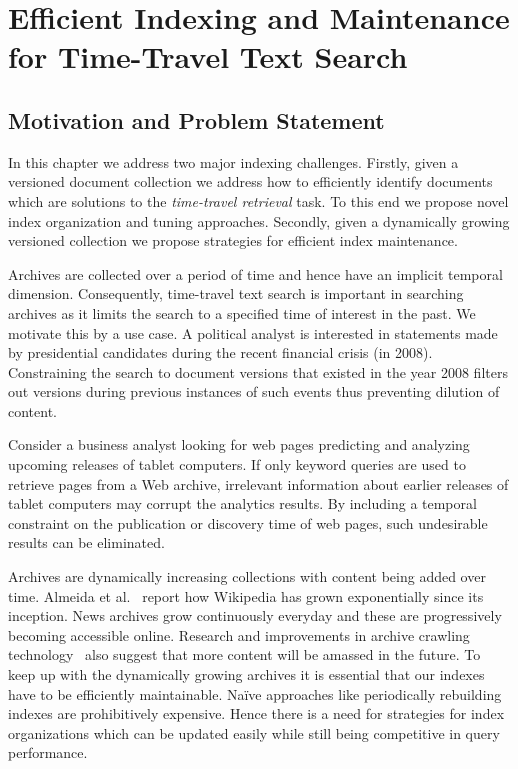 \chapter{Efficient Indexing and Maintenance for Time-Travel Text Search}
\label{chap:sharding}

\section{Motivation and Problem Statement}
In this chapter we address two major indexing challenges. Firstly, 
given a versioned document collection we address how to efficiently 
identify documents which are solutions to the \emph{time-travel 
retrieval} task. To this end we propose novel index organization and tuning approaches. Secondly, given a dynamically growing versioned 
collection we propose strategies for efficient index maintenance.

Archives are collected over a period of time and 
hence have an implicit temporal dimension. Consequently, time-travel text search is important in searching archives as it limits the search to a 
specified time of interest in the past. We motivate this by a use case. A political analyst is interested in statements made by 
presidential candidates during the recent financial crisis (in 2008). 
Constraining the search to document versions that existed in the year 2008 filters out versions during
previous instances of such events thus preventing dilution of 
content.

Consider a business analyst looking for web pages
predicting and analyzing upcoming releases of tablet computers.  If only keyword
queries are used to retrieve pages from a Web archive, irrelevant
information about earlier releases of tablet computers may 
corrupt the analytics results. By including a temporal constraint
on the publication or discovery time of web pages, such undesirable results can be eliminated. 


Archives are dynamically increasing collections with content being 
added over time. Almeida et al.~\cite{Almeida:icwsm07} 
report how Wikipedia has grown exponentially since its inception. News 
archives grow continuously everyday and these are progressively becoming 
accessible online. Research and improvements in archive crawling technology~\cite{Denev12, nutchwax} 
also suggest that more content will be amassed in the future. 
To keep up with the dynamically growing archives it is essential that
our indexes have to be efficiently maintainable. Na\"ive 
approaches like periodically rebuilding indexes are prohibitively expensive. 
Hence there is a need for strategies for index organizations which can be 
updated easily while still being competitive in query performance.

